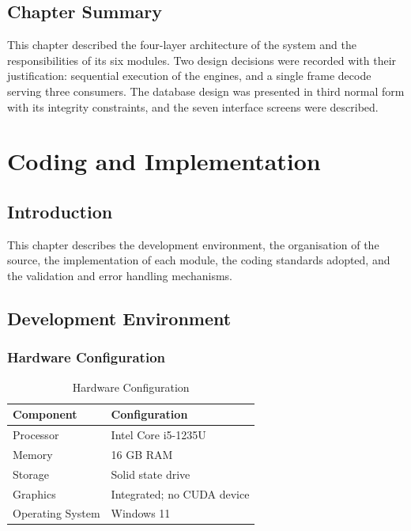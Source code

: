 \documentclass[12pt,a4paper,twoside]{report}
\begin{document}
\section{Chapter Summary}

This chapter described the four-layer architecture of the system and the responsibilities of its six modules. Two design decisions were recorded with their justification: sequential execution of the engines, and a single frame decode serving three consumers. The database design was presented in third normal form with its integrity constraints, and the seven interface screens were described.

\chapter{Coding and Implementation}

\section{Introduction}

This chapter describes the development environment, the organisation of the source, the implementation of each module, the coding standards adopted, and the validation and error handling mechanisms.

\section{Development Environment}

\subsection{Hardware Configuration}

\begin{table}[h]
\centering
\begin{tabular}{|p{5cm}|p{7cm}|}
\hline
\textbf{Component} & \textbf{Configuration} \\
\hline
Processor & Intel Core i5-1235U \\
\hline
Memory & 16 GB RAM \\
\hline
Storage & Solid state drive \\
\hline
Graphics & Integrated; no CUDA device \\
\hline
Operating System & Windows 11 \\
\hline
\end{tabular}
\caption{Hardware Configuration}
\end{table}
\end{document}
